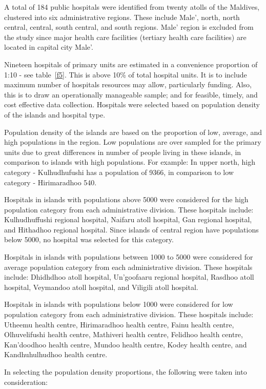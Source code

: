 A total of 184 public hospitals were identified from twenty atolls of the Maldives, clustered into six administrative regions. These include Male', north, north central, central, south central, and south regions. Male' region is excluded from the study since major health care facilities (tertiary health care facilities) are located in capital city Male'. 

Nineteen hospitals of primary units are estimated in a convenience proportion of 1:10 - see table~\ref{f5}. This is above 10\% of total hospital units. It is to include maximum number of hospitals resources may allow, particularly funding. Also, this is to draw an operationally manageable sample; and for feasible, timely, and cost effective data collection. Hospitals were selected based on population density of the islands and hospital type. 

Population density of the islands are based on the proportion of low, average, and high populations in the region. Low populations are over sampled for the primary units due to great differences in number of people living in these islands, in comparison to islands with high populations. For example: In upper north, high category - Kulhudhufushi has a population of 9366, in comparison to low category - Hirimaradhoo 540. 

Hospitals in islands with populations above 5000 were considered for the high population category from each administrative division. These hospitals include: Kulhudhuffushi regional hospital, Naifaru atoll hospital, Gan regional hospital, and Hithadhoo regional hospital. Since islands of central region have populations below 5000, no hospital was selected for this category.

Hospitals in islands with populations between 1000 to 5000 were considered for average population category from each administrative division. These hospitals include: Dhidhdhoo atoll hospital, Un'goofaaru regional hospital, Rasdhoo atoll hospital, Veymandoo atoll hospital, and Viligili atoll hospital.

Hospitals in islands with populations below 1000 were considered for low population category from each administrative division. These hospitals include: Utheemu health centre, Hirimaradhoo health centre, Fainu health centre, Olhuvelifushi health centre, Mathiveri health centre, Felidhoo health centre, Kan'doodhoo health centre, Mundoo health centre, Kodey health centre, and  Kandhuhulhudhoo health centre. 

In selecting the population density proportions, the following were taken into consideration:

